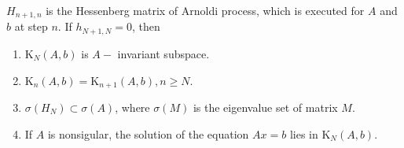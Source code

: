\documentclass{ctexart}
\newcommand{\Kappa}{\mathrm{K}}
\newif\ifpreface
\begin{document}
\large
\setlength{\baselineskip}{1.2em}
\ifpreface

\newgeometry{left=2cm,right=2cm,top=2cm,bottom=2cm}
\else
{}
\maketitle
\fi

\begin{problem}\label{pro:1}
  \(H_{n + 1,n} \) is the Hessenberg matrix of Arnoldi process, which is executed for \(A \) and \(b \) at step \(n \).
  If \(h_{N + 1,N} =0\), then
  \begin{enumerate}
    \item \(\Kappa_N(A,b) \) is \(A- \) invariant subspace.
    \item \(\Kappa_n(A,b)=\Kappa_{n + 1}(A,b), n \geq N \).
    \item \(\sigma(H_N) \subset \sigma(A) \), where \(\sigma(M) \) is the eigenvalue set of matrix \(M \).
    \item If \(A \) is nonsigular, the solution of the equation \(Ax=b \) lies in \(\Kappa_N(A,b) \).
  \end{enumerate}
\end{problem}
\end{document}
